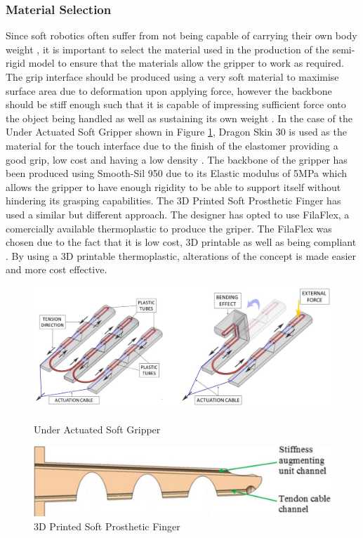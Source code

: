 \documentclass[11pt]{article}
\begin{document}
\subsubsection{Material Selection}
Since soft robotics often suffer from not being capable of carrying their own body weight \cite{mutlu2016mechanical}, it is important to select the material used in the production of the semi-rigid model to ensure that the materials allow the gripper to work as required. The grip interface should be produced using a very soft material to maximise surface area due to deformation upon applying force, however the backbone should be stiff enough such that it is capable of impressing sufficient force onto the object being handled as well as sustaining its own weight \cite{hassan2015design}. In the case of the Under Actuated Soft Gripper shown in Figure \ref{fig:Tendon2}, Dragon Skin 30 is used as the material for the touch interface due to the finish of the elastomer providing a good grip, low cost and having a low density \cite{hassan2015design}. The backbone of the gripper has been produced using Smooth-Sil 950 due to its Elastic modulus of 5MPa which allows the gripper to have enough rigidity to be able to support itself without hindering its grasping capabilities. The 3D Printed Soft Prosthetic Finger has used a similar but different approach. The designer has opted to use FilaFlex, a comercially available thermoplastic to produce the griper. The FilaFlex was chosen due to the fact that it is low cost, 3D printable as well as being compliant \cite{mutlu2016mechanical}. By using a 3D printable thermoplastic, alterations of the  concept is made easier and more cost effective.
\begin{figure}[!h]
\centering
\begin{minipage}[b]{.6\textwidth}
\includegraphics[width=\linewidth]{Tendon}
\caption{Under Actuated Soft Gripper}
\label{fig:Tendon}
\end{minipage}
\hfill
\begin{minipage}[b]{0.35\textwidth}
\includegraphics[width=1.25\linewidth]{Tendon2}
\caption{3D Printed Soft Prosthetic Finger}
\label{fig:Tendon2}
\end{minipage}
\end{figure}
\end{document}

